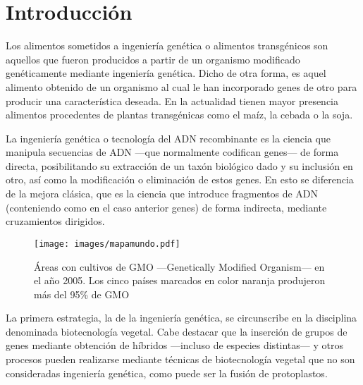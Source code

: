 \documentclass[11pt,twoside]{article}
\begin{document}
\section{Introducción}

Los alimentos sometidos a ingeniería genética o alimentos transgénicos son aquellos que fueron producidos a partir de un organismo modificado genéticamente mediante ingeniería genética. Dicho de otra forma, es aquel alimento obtenido de un organismo al cual le han incorporado genes de otro para producir una característica deseada. En la actualidad tienen mayor presencia alimentos procedentes de plantas transgénicas como el maíz, la cebada o la soja.


La ingeniería genética o tecnología del ADN recombinante es la ciencia que manipula secuencias de ADN ---que normalmente codifican genes--- de forma directa, posibilitando su extracción de un taxón biológico dado y su inclusión en otro, así como la modificación o eliminación de estos genes. En esto se diferencia de la mejora clásica, que es la ciencia que introduce fragmentos de ADN (conteniendo como en el caso anterior genes) de forma indirecta, mediante cruzamientos dirigidos.





%

\begin{figure}[h!]
\begin{center}
\texttt{[image: images/mapamundo.pdf]}
\end{center}
\caption{Áreas con cultivos de GMO ---Genetically Modified Organism--- en el año 2005. Los cinco países marcados en color naranja produjeron más del 95\% de GMO}\label{fig.mapamundo}
\end{figure}


La primera estrategia, la de la ingeniería genética, se circunscribe en la disciplina denominada biotecnología vegetal. Cabe destacar que la inserción de grupos de genes mediante obtención de híbridos ---incluso de especies distintas--- y otros procesos pueden realizarse mediante técnicas de biotecnología vegetal que no son consideradas ingeniería genética, como puede ser la fusión de protoplastos.
\end{document}
